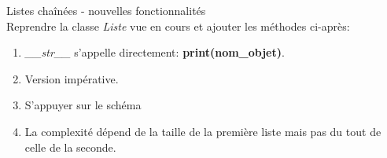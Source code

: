 \documentclass[a4paper,11pt]{article}
\begin{document}
\begin{Form}
\begin{exo}
Listes chaînées - nouvelles fonctionnalités\\
Reprendre la classe \emph{Liste} vue en cours et ajouter les méthodes ci-après:
\begin{enumerate}
\item \emph{\_\_str\_\_} s'appelle directement: \textbf{print(nom\_objet)}.

\item Version impérative.

\item S'appuyer sur le schéma

\item La complexité dépend de la taille de la première liste mais pas du tout de celle de la seconde.
\end{enumerate}
\end{exo}

\pagebreak

\begin{exo}

\end{exo}
\end{Form}
\end{document}

